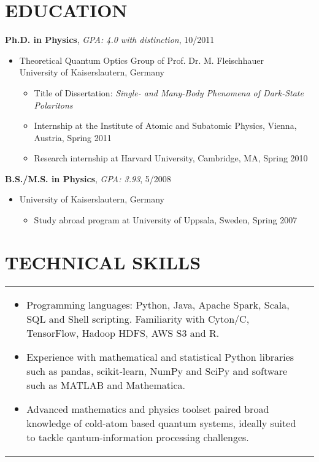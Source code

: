 \documentclass[10pt,centered]{./res} %
\begin{document}
\begin{resume}
\section{\color{ResumeBlue}EDUCATION}

{\bf Ph.D. in Physics}, {\it GPA: 4.0 with distinction}, 10/2011
\begin{itemize}
 \item[] Theoretical Quantum Optics Group of Prof. Dr. M. Fleischhauer\\ University of Kaiserslautern, Germany
    \begin{itemize}
      \item Title of Dissertation: \textit{Single- and Many-Body Phenomena of Dark-State Polaritons}
      \item Internship at the Institute of Atomic and Subatomic Physics, Vienna, Austria, Spring 2011
      \item Research internship at Harvard University, Cambridge, MA, Spring 2010
    \end{itemize}
\end{itemize}
\vspace*{-0.2cm}
{\bf B.S./M.S. in Physics}, {\it GPA: 3.93}, 5/2008
\begin{itemize}
 \item[] University of Kaiserslautern, Germany
     \begin{itemize}
      \item Study abroad program at University of Uppsala, Sweden, Spring 2007
    \end{itemize}
\end{itemize}

\section{\color{ResumeBlue}TECHNICAL SKILLS}

\vspace*{0.2cm}
\hspace*{-.9cm}
\begin{tabular}{p{5.85in}>{\raggedleft\arraybackslash}p{.1in}}
\begin{itemize}
  \item Programming languages: Python, Java, Apache Spark, Scala, SQL and Shell scripting. Familiarity with Cyton/C, TensorFlow, Hadoop HDFS, AWS S3 and R.
  \item Experience with mathematical and statistical Python libraries such as pandas, scikit-learn, NumPy and SciPy and software such as MATLAB and {\sc Mathematica}.
  \item Advanced mathematics and physics toolset paired broad knowledge of cold-atom based quantum systems, ideally suited to tackle qantum-information processing challenges.
\end{itemize}
 & \\
\end{tabular}


\end{resume}
\end{document}
